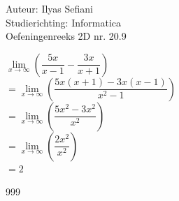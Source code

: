 \documentclass[a4paper]{article}
\begin{document}
\noindent \large Auteur: Ilyas Sefiani \\
\noindent \large Studierichting: Informatica\\
\noindent \large Oefeningenreeks 2D nr. 20.9\\

\medskip

\normalsize

$\lim\limits_{x \rightarrow \infty}\left(\dfrac{5x}{x-1}-\dfrac{3x}{x+1}\right)$\\

$=\lim\limits_{x \rightarrow \infty}\left(\dfrac{5x(x+1)-3x(x-1)}{x^2-1}\right)$\\

$=\lim\limits_{x \rightarrow \infty}\left(\dfrac{5x^2-3x^2}{x^2}\right)$\\

$=\lim\limits_{x \rightarrow \infty}\left(\dfrac{2x^2}{x^2}\right)$\\

$=2$\\

\begin{thebibliography}{999}
\end{thebibliography}
\end{document}
